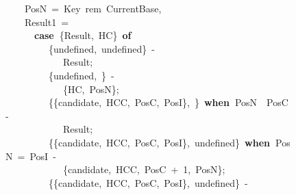 \documentclass[runningheads,a4paper]{llncs}
\newcommand{\hlstd}[1]{\textcolor[rgb]{0,0,0}{#1}}
\newcommand{\hlnum}[1]{\textcolor[rgb]{0.69,0.49,0}{#1}}
\newcommand{\hlopt}[1]{\textcolor[rgb]{0,0,0}{#1}}
\newcommand{\hlkwa}[1]{\textcolor[rgb]{0,0,0}{\bf{#1}}}
\begin{document}
\begin{figure}
\hlstd{}\hlstd{\ \ \ \ }\hlstd{PosN\ }\hlopt{=\ }\hlstd{Key\ rem\ CurrentBase}\hlopt{,}\hspace*{\fill}\\
\hlstd{}\hlstd{\ \ \ \ }\hlstd{Result1\ }\hlopt{=}\hspace*{\fill}\\
\hlstd{}\hlstd{\ \ \ \ \ \ }\hlstd{}\hlkwa{case\ }\hlstd{}\hlopt{\{}\hlstd{Result}\hlopt{,\ }\hlstd{HC}\hlopt{\}\ }\hlstd{}\hlkwa{of}\hspace*{\fill}\\
\hlstd{}\hlstd{\ \ \ \ \ \ \ \ \ }\hlstd{}\hlopt{\{}\hlstd{undefined}\hlopt{,\ }\hlstd{undefined}\hlopt{\}\ {-}}\hspace*{\fill}\\
\hlstd{}\hlstd{\ \ \ \ \ \ \ \ \ \ \ \ }\hlstd{Result}\hlopt{;}\hspace*{\fill}\\
\hlstd{}\hlstd{\ \ \ \ \ \ \ \ \ }\hlstd{}\hlopt{\{}\hlstd{undefined}\hlopt{,\ }\hlstd{\textunderscore }\hlopt{\}\ {-}}\hspace*{\fill}\\
\hlstd{}\hlstd{\ \ \ \ \ \ \ \ \ \ \ \ }\hlstd{}\hlopt{\{}\hlstd{HC}\hlopt{,\ }\hlstd{PosN}\hlopt{\};}\hspace*{\fill}\\
\hlstd{}\hlstd{\ \ \ \ \ \ \ \ \ }\hlstd{}\hlopt{\{\{}\hlstd{candidate}\hlopt{,\ }\hlstd{\textunderscore HCC}\hlopt{,\ }\hlstd{PosC}\hlopt{,\ }\hlstd{\textunderscore PosI}\hlopt{\},\ }\hlstd{\textunderscore }\hlopt{\}\ }\hlstd{}\hlkwa{when\ }\hlstd{PosN\ }\hlopt{\ }\hlstd{PosC\ }\hlopt{{-}}\hspace*{\fill}\\
\hlstd{}\hlstd{\ \ \ \ \ \ \ \ \ \ \ \ }\hlstd{Result}\hlopt{;}\hspace*{\fill}\\
\hlstd{}\hlstd{\ \ \ \ \ \ \ \ \ }\hlstd{}\hlopt{\{\{}\hlstd{candidate}\hlopt{,\ }\hlstd{HCC}\hlopt{,\ }\hlstd{PosC}\hlopt{,\ }\hlstd{PosI}\hlopt{\},\ }\hlstd{undefined}\hlopt{\}\ }\hlstd{}\hlkwa{when\ }\hlstd{PosN\ }\hlopt{=\ }\hlstd{PosI\ }\hlopt{{-}}\hspace*{\fill}\\
\hlstd{}\hlstd{\ \ \ \ \ \ \ \ \ \ \ \ }\hlstd{}\hlopt{\{}\hlstd{candidate}\hlopt{,\ }\hlstd{HCC}\hlopt{,\ }\hlstd{PosC\ }\hlopt{+\ }\hlstd{}\hlnum{1}\hlstd{}\hlopt{,\ }\hlstd{PosN}\hlopt{\};}\hspace*{\fill}\\
\hlstd{}\hlstd{\ \ \ \ \ \ \ \ \ }\hlstd{}\hlopt{\{\{}\hlstd{candidate}\hlopt{,\ }\hlstd{HCC}\hlopt{,\ }\hlstd{PosC}\hlopt{,\ }\hlstd{PosI}\hlopt{\},\ }\hlstd{undefined}\hlopt{\}\ {-}}\hspace*{\fill}\\

\end{figure}
\end{document}
